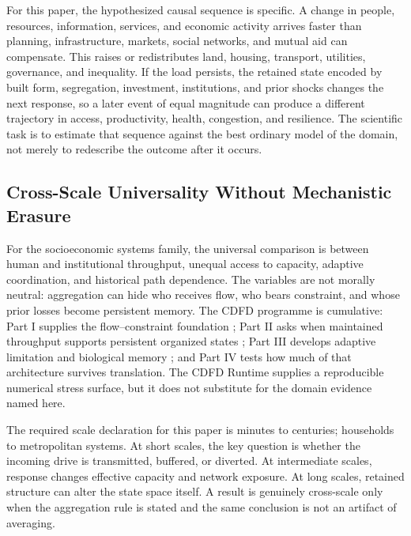 \documentclass[11pt,a4paper]{article}
\begin{document}
For this paper, the hypothesized causal sequence is specific. A change in
people, resources, information, services, and economic activity arrives faster than planning, infrastructure, markets, social networks, and mutual aid can compensate.
This raises or redistributes land, housing, transport, utilities, governance, and inequality. If the load persists,
the retained state encoded by built form, segregation, investment, institutions, and prior shocks changes the next response, so a later event of equal
magnitude can produce a different trajectory in access, productivity, health, congestion, and resilience. The
scientific task is to estimate that sequence against the best ordinary model of
the domain, not merely to redescribe the outcome after it occurs.

\subsection{Cross-Scale Universality Without Mechanistic Erasure}

For the socioeconomic systems family, the universal comparison is between human and institutional throughput, unequal access to capacity, adaptive coordination, and historical path dependence. The variables are not morally neutral: aggregation can hide who receives flow, who bears constraint, and whose prior losses become persistent memory. \cite{BarabasiAlbert1999,WattsStrogatz1998,Holling1973,Shannon1948}
The CDFD programme is cumulative: Part I supplies the flow--constraint
foundation \cite{MujjabiPartI2026}; Part II asks when maintained throughput
supports persistent organized states \cite{MujjabiPartII2026}; Part III
develops adaptive limitation and biological memory \cite{MujjabiPartIII2026};
and Part IV \cite{MujjabiPartIV2026} tests how much of that architecture
survives translation. The CDFD Runtime \cite{CDFDRuntime2026} supplies a
reproducible numerical stress surface, but it does not substitute for the
domain evidence named here.

The required scale declaration for this paper is minutes to centuries; households to metropolitan systems. At short
scales, the key question is whether the incoming drive is transmitted,
buffered, or diverted. At intermediate scales, response changes effective
capacity and network exposure. At long scales, retained structure can alter the
state space itself. A result is genuinely cross-scale only when the aggregation
rule is stated and the same conclusion is not an artifact of averaging.
\end{document}
